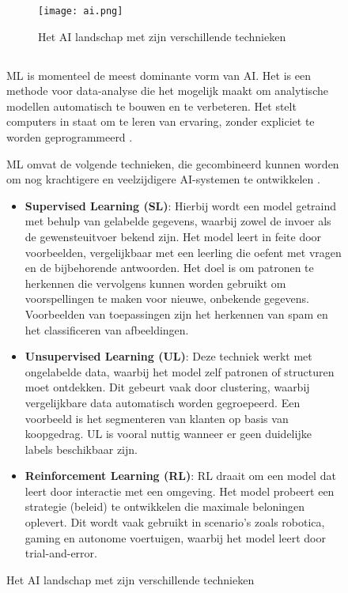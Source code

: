 \begin{figure}[h]
\begin{figure}
  \centering
  \texttt{[image: ai.png]}
  \caption[Figuur 1]{\label{fig:ai}Het AI landschap met zijn verschillende technieken \autocite{Kouassi2023}}
\end{figure}

\subsection{}%
\label{subsec:machine-learning}

ML is momenteel de meest dominante vorm van AI. Het is een methode voor data-analyse die het mogelijk maakt om analytische modellen automatisch te bouwen en te verbeteren. Het stelt computers in staat om te leren van ervaring, zonder expliciet te worden geprogrammeerd \autocite{SharifaniEtAl2023}.

\medskip

ML omvat de volgende technieken, die gecombineerd kunnen worden om nog krachtigere en veelzijdigere AI-systemen te ontwikkelen \autocite{Kouassi2023}. 

\begin{itemize}
  \item \textbf{Supervised Learning (SL)}: Hierbij wordt een model getraind met behulp van gelabelde gegevens, waarbij zowel de invoer als de gewensteuitvoer bekend zijn. Het model leert in feite door voorbeelden, vergelijkbaar met een leerling die oefent met vragen en de bijbehorende antwoorden. Het doel is om patronen te herkennen die vervolgens kunnen worden gebruikt om voorspellingen te maken voor nieuwe, onbekende gegevens. Voorbeelden van toepassingen zijn het herkennen van spam en het classificeren van afbeeldingen.
  \item \textbf{Unsupervised Learning (UL)}: Deze techniek werkt met ongelabelde data, waarbij het model zelf patronen of structuren moet ontdekken. Dit gebeurt vaak door clustering, waarbij vergelijkbare data automatisch worden gegroepeerd. Een voorbeeld is het segmenteren van klanten op basis van koopgedrag. UL is vooral nuttig wanneer er geen duidelijke labels beschikbaar zijn. 
  \item \textbf{Reinforcement Learning (RL)}: RL draait om een model dat leert door interactie met een omgeving. Het model probeert een strategie (beleid) te ontwikkelen die maximale beloningen oplevert. Dit wordt vaak gebruikt in scenario's zoals robotica, gaming en autonome voertuigen, waarbij het model leert door trial-and-error. 
\end{itemize}


\end{figure}

